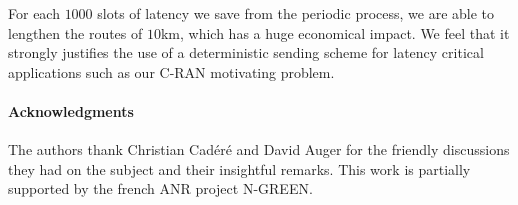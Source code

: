 \documentclass[10pt, conference, letterpaper]{IEEEtran}
\newcommand\pazl{\textsc{pazl}\xspace}
\newcommand\pall{\textsc{pall}\xspace}
\begin{document}
     For each $1000$ slots of latency we save from the periodic process, we are able to lengthen the routes of $10$km, which has a huge economical impact. We feel that it strongly justifies the use of a deterministic sending scheme for latency critical applications such as our C-RAN motivating problem.     
% 
% 
%    
% 
% 

 \paragraph*{Acknowledgments} The authors thank Christian Cad\'er\'e and David Auger for the friendly discussions
 they had on the subject and their insightful remarks. This work is partially supported by the french ANR project N-GREEN.



\end{document}
